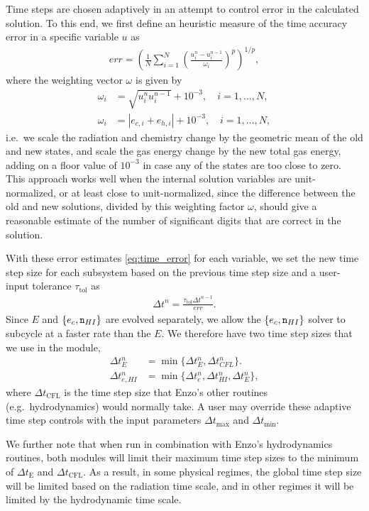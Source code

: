\documentclass[letterpaper,10pt]{article}
\renewcommand{\(}{\left(}
\renewcommand{\)}{\right)}
\newcommand{\dt}{\Delta t}
\newcommand{\mn}{{\tt n}}
\begin{document}
Time steps are chosen adaptively in an attempt to control error in the
calculated solution.  To this end, we first define an heuristic
measure of the time accuracy error in a specific variable $u$ as
\begin{align}
\label{eq:time_error}
  err = \left(\frac1N \sum_{i=1}^N
    \left(\frac{u_i^{n}-u_i^{n-1}}{\omega_i}\right)^p\right)^{1/p}, 
\end{align}
where the weighting vector $\omega$ is given by
\begin{align}
\label{eq:time_weighting}
  \omega_i &= \sqrt{u_i^n u_i^{n-1}} + 10^{-3}, \quad i=1,\ldots,N, \\
  \omega_i &= |e_{c,i} + e_{h,i}| + 10^{-3}, \quad i=1,\ldots,N,
\end{align}
i.e.~we scale the radiation and chemistry change by the geometric mean
of the old and new states, and scale the gas energy change by the new
total gas energy, adding on a floor value of $10^{-3}$ in case any
of the states are too close to zero.  This approach works well when
the internal solution variables are unit-normalized, or at least close
to unit-normalized, since the difference between the old and new
solutions, divided by this weighting factor $\omega$, should give a
reasonable estimate of the number of significant digits that are
correct in the solution. 

With these error estimates \eqref{eq:time_error} for each variable, we
set the new time step size for each subsystem based on the previous
time step size and a user-input tolerance $\tau_{\text{tol}}$ as
\begin{align}
\label{eq:time_estimate}
  \dt^{n} = \frac{\tau_{\text{tol}} \dt^{n-1}}{err}.
\end{align}
Since $E$ and $\{e_c,\mn_{HI}\}$ are evolved separately,
we allow the $\{e_c,\mn_{HI}\}$ solver to subcycle at a faster rate
than the $E$.  We therefore have two time step sizes that we use in
the module,
\begin{align}
\label{eq:FLD_time_estimate}
  \dt_{E}^{n} &= \min\{\dt_{E}^{n},\dt_{CFL}^{n}\}. \\
  \dt_{e,HI}^{n} &= \min\{\dt_{e}^{n},\dt_{HI}^{n},\dt_{E}^{n}\},
\end{align}
where $\dt_{\text{CFL}}$ is the time step size that Enzo's other
routines (e.g.~hydrodynamics) would normally take.  A user may
override these adaptive time step controls with the input parameters 
$\dt_{\text{max}}$ and $\dt_{\text{min}}$. 

We further note that when run in combination with Enzo's hydrodynamics
routines, both modules will limit their maximum time step sizes to the
minimum of $\dt_{\text{E}}$ and $\dt_{\text{CFL}}$.  As a result, in
some physical regimes, the global time step size will be limited based
on the radiation time scale, and in other regimes it will be limited
by the hydrodynamic time scale. 
\end{document}
